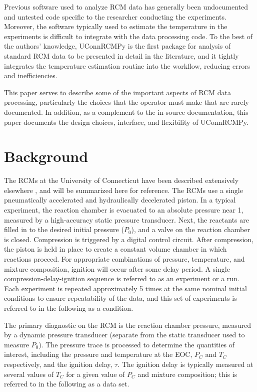 \documentclass[12pt]{../ussci}
\begin{document}
Previous software used to analyze RCM data has generally been
undocumented and untested code specific to the researcher conducting the
experiments. Moreover, the software typically used to estimate the
temperature in the experiments is difficult to integrate with the data
processing code. To the best of the authors' knowledge, UConnRCMPy is
the first package for analysis of standard RCM data to be presented in
detail in the literature, and it tightly integrates the temperature
estimation routine into the workflow, reducing errors and
inefficiencies.

This paper serves to describe some of the important aspects of RCM data
processing, particularly the choices that the operator must make that
are rarely documented. In addition, as a complement to the in-source
documentation, this paper documents the design choices, interface, and
flexibility of UConnRCMPy.

\section{Background}\label{background}

The RCMs at the University of Connecticut have been described
extensively elsewhere \autocite{Das2012,Mittal2007a}, and
will be summarized here for reference. The RCMs use a single
pneumatically accelerated and hydraulically decelerated piston. In a
typical experiment, the reaction chamber is evacuated to an absolute
pressure near \SI{1}{\torr}, measured by a high-accuracy static pressure
transducer. Next, the reactants are filled in to the desired initial
pressure (\(P_0\)), and a valve on the reaction chamber is closed.
Compression is triggered by a digital control circuit. After
compression, the piston is held in place to create a constant volume
chamber in which reactions proceed. For appropriate combinations of
pressure, temperature, and mixture composition, ignition will occur
after some delay period. A single compression-delay-ignition sequence is
referred to as an experiment or a run. Each experiment is repeated
approximately 5 times at the same nominal initial conditions to ensure
repeatability of the data, and this set of experiments is referred to in
the following as a condition.

The primary diagnostic on the RCM is the reaction chamber pressure,
measured by a dynamic pressure transducer (separate from the static
transducer used to measure \(P_0\)). The pressure trace is processed to
determine the quantities of interest, including the pressure and
temperature at the EOC, \(P_C\) and \(T_C\) respectively, and the
ignition delay, \(\tau\). The ignition delay is typically measured at
several values of \(T_C\) for a given value of \(P_C\) and mixture
composition; this is referred to in the following as a data set.
\end{document}
